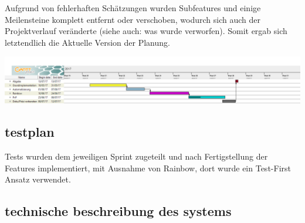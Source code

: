 \documentclass[12pt]{article}
\theoremstyle{plain}
\begin{document}
Aufgrund von fehlerhaften Schätzungen wurden Subfeatures und einige Meilensteine komplett entfernt oder verschoben, wodurch sich auch der Projektverlauf veränderte (siehe auch: was wurde verworfen). Somit ergab sich letztendlich die Aktuelle Version der Planung.


\includegraphics[scale=0.3]{images/gant.png}
\newline

\subsection{testplan}
Tests wurden dem jeweiligen Sprint zugeteilt und nach Fertigstellung der Features implementiert,
mit Ausnahme von Rainbow, dort wurde ein Test-First Ansatz verwendet.

\subsection{technische beschreibung des systems}
\end{document}
